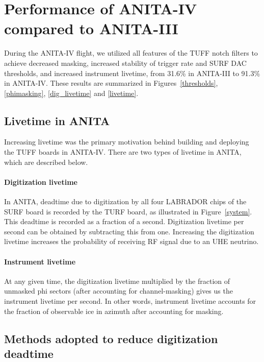\documentclass[preprint,12pt]{elsarticle}
\begin{document}
\section{Performance of ANITA-IV compared to ANITA-III}

During the ANITA-IV flight, 
we utilized all features of the TUFF notch filters to achieve decreased masking, 
increased stability of trigger rate and SURF DAC thresholds, and increased instrument livetime, 
from 31.6\% in ANITA-III to 91.3\% in ANITA-IV.
These results are summarized in 
Figures~\ref{thresholds}, \ref{phimasking}, \ref{dig_livetime} and \ref{livetime}.

\subsection{Livetime in ANITA} 
\label{livetime_section}

Increasing livetime was the primary motivation behind building and deploying the TUFF boards in ANITA-IV. 
There are two types of livetime in ANITA, which are described below.

\paragraph{Digitization livetime} 

In ANITA, deadtime due to digitization by all four LABRADOR chips of the SURF board is recorded by 
the TURF board, as illustrated in Figure~\ref{system}. 
This deadtime is recorded as a fraction of a second. Digitization livetime per second can be 
obtained by subtracting this from one. 
Increasing the digitization livetime increases the probability of receiving RF signal due to an UHE neutrino. 

\paragraph{Instrument livetime} 

At any given time, the digitization livetime multiplied by the fraction of unmasked phi sectors (after accounting for channel-masking) gives us the instrument livetime per second. 
In other words, instrument livetime accounts for the fraction of observable ice in azimuth after accounting for masking. 

\subsection{Methods adopted to reduce digitization deadtime}
\label{methods}
\end{document}
